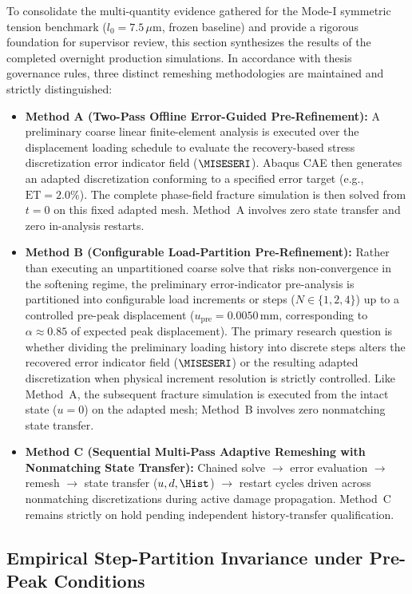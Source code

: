 To consolidate the multi-quantity evidence gathered for the Mode-I symmetric tension benchmark ($l_0 = 7.5\,\mu\mathrm{m}$, frozen baseline) and provide a rigorous foundation for supervisor review, this section synthesizes the results of the completed overnight production simulations. In accordance with thesis governance rules, three distinct remeshing methodologies are maintained and strictly distinguished:
\begin{itemize}
  \item \textbf{Method A (Two-Pass Offline Error-Guided Pre-Refinement):} A preliminary coarse linear finite-element analysis is executed over the displacement loading schedule to evaluate the recovery-based stress discretization error indicator field ($\MISESERI$). Abaqus CAE then generates an adapted discretization conforming to a specified error target (e.g., $\mathrm{ET} = 2.0\%$). The complete phase-field fracture simulation is then solved from $t = 0$ on this fixed adapted mesh. Method~A involves zero state transfer and zero in-analysis restarts.
  \item \textbf{Method B (Configurable Load-Partition Pre-Refinement):} Rather than executing an unpartitioned coarse solve that risks non-convergence in the softening regime, the preliminary error-indicator pre-analysis is partitioned into configurable load increments or steps ($N \in \{1, 2, 4\}$) up to a controlled pre-peak displacement ($u_{\mathrm{pre}} = 0.0050\,\mathrm{mm}$, corresponding to $\alpha \approx 0.85$ of expected peak displacement). The primary research question is whether dividing the preliminary loading history into discrete steps alters the recovered error indicator field ($\MISESERI$) or the resulting adapted discretization when physical increment resolution is strictly controlled. Like Method~A, the subsequent fracture simulation is executed from the intact state ($u = 0$) on the adapted mesh; Method~B involves zero nonmatching state transfer.
  \item \textbf{Method C (Sequential Multi-Pass Adaptive Remeshing with Nonmatching State Transfer):} Chained solve $\to$ error evaluation $\to$ remesh $\to$ state transfer ($u, d, \Hist$) $\to$ restart cycles driven across nonmatching discretizations during active damage propagation. Method~C remains strictly on hold pending independent history-transfer qualification.
\end{itemize}

\subsection{Empirical Step-Partition Invariance under Pre-Peak Conditions}
\label{subsec:gate6b_partition_invariance}

